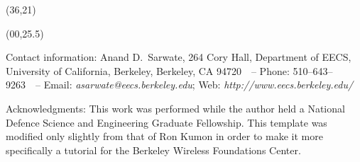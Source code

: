 \documentclass{article}
\renewcommand{\footnotesize}{\fontsize{17.28}{22}\selectfont}
\begin{document}
\begin{textblock}{10}(36,21)


\end{textblock}



\begin{textblock}{46}(00,25.5)
\begin{center}
{\footnotesize Contact information:
Anand D.~Sarwate, 264 Cory Hall, Department of EECS, University of California, Berkeley, Berkeley, CA 94720\ \ --
Phone: 510--643--9263\ \ -- 
Email: \textit{asarwate@eecs.berkeley.edu}; 
Web: \textit{http://www.eecs.berkeley.edu/}
}
\vspace{-0.75\baselineskip}

{\footnotesize Acknowledgments: This work was performed while the
author held a National Defence Science and Engineering Graduate
Fellowship.  This template was modified only slightly from that of Ron
Kumon in order to make it more specifically a tutorial for the
Berkeley Wireless Foundations Center.}
\end{center}
\end{textblock}
\end{document}
